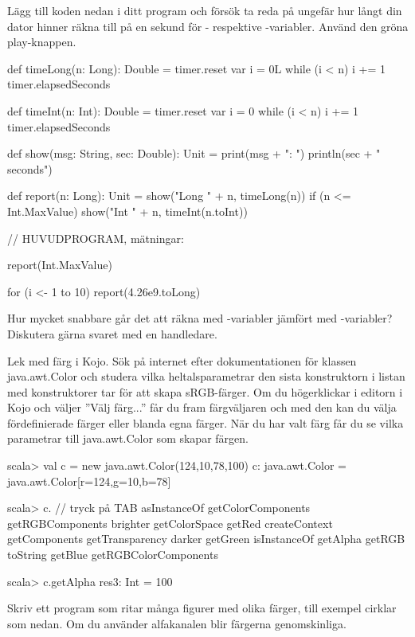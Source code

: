 \Subtask Lägg till koden nedan i ditt program och försök ta reda på ungefär hur långt din dator hinner räkna till på en sekund för - respektive -variabler. Använd den gröna play-knappen.
\begin{Code}
def timeLong(n: Long): Double = {
  timer.reset
  var i = 0L
  while (i < n) { i += 1 }
  timer.elapsedSeconds
}

def timeInt(n: Int): Double = {
  timer.reset
  var i = 0
  while (i < n) { i += 1 }
  timer.elapsedSeconds
}

def show(msg: String, sec: Double): Unit = {
  print(msg + ": ")
  println(sec + " seconds")
}

def report(n: Long): Unit = {
  show("Long " + n, timeLong(n))
  if (n <= Int.MaxValue) show("Int  " + n, timeInt(n.toInt))
}

// HUVUDPROGRAM, mätningar:

report(Int.MaxValue)

for (i <- 1 to 10) {
  report(4.26e9.toLong)
}
\end{Code}

\Subtask Hur mycket snabbare går det att räkna med -variabler jämfört med -variabler? Diskutera gärna svaret med en handledare.

\Task Lek med färg i Kojo. Sök på internet efter dokumentationen för klassen java.awt.Color och studera vilka heltalsparametrar den sista konstruktorn i listan med konstruktorer tar för att skapa sRGB-färger. Om du högerklickar i editorn i Kojo och väljer ''Välj färg...'' får du fram färgväljaren och med den kan du välja fördefinierade färger eller blanda egna färger. När du har valt färg får du se vilka parametrar till java.awt.Color som skapar färgen.

\begin{REPL}
scala> val c = new java.awt.Color(124,10,78,100)
c: java.awt.Color = java.awt.Color[r=124,g=10,b=78]

scala> c.  // tryck på TAB
asInstanceOf    getColorComponents      getRGBComponents
brighter        getColorSpace           getRed
createContext   getComponents           getTransparency
darker          getGreen                isInstanceOf
getAlpha        getRGB                  toString
getBlue         getRGBColorComponents

scala> c.getAlpha
res3: Int = 100
\end{REPL}
Skriv ett program som ritar många figurer med olika färger, till exempel cirklar som nedan. Om du använder alfakanalen blir färgerna genomskinliga.

